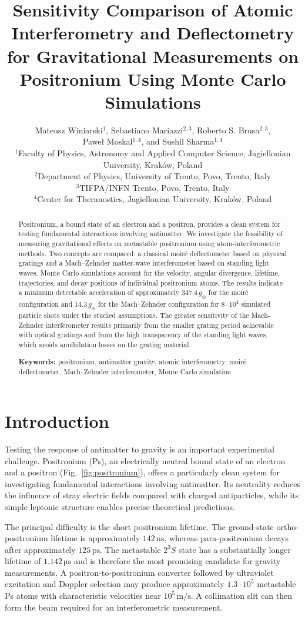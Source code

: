 \documentclass[10pt,twocolumn]{article}
\title{Sensitivity Comparison of Atomic Interferometry and Deflectometry for Gravitational Measurements on Positronium Using Monte Carlo Simulations}
\author{
Mateusz Winiarski$^{1}$, Sebastiano Mariazzi$^{2,3}$, Roberto S. Brusa$^{2,3}$,\\
Paweł Moskal$^{1,4}$, and Sushil Sharma$^{1,4}$\\[1ex]
\small $^{1}$Faculty of Physics, Astronomy and Applied Computer Science, Jagiellonian University, Kraków, Poland\\
\small $^{2}$Department of Physics, University of Trento, Povo, Trento, Italy\\
\small $^{3}$TIFPA/INFN Trento, Povo, Trento, Italy\\
\small $^{4}$Center for Theranostics, Jagiellonian University, Kraków, Poland
}
\date{}
\newcommand{\keywords}[1]{\par\medskip\noindent\textbf{Keywords:} #1}
\begin{document}
\maketitle

\begin{abstract}
Positronium, a bound state of an electron and a positron, provides a clean system for testing fundamental interactions involving antimatter. We investigate the feasibility of measuring gravitational effects on metastable positronium using atom-interferometric methods. Two concepts are compared: a classical moir\'e deflectometer based on physical gratings and a Mach--Zehnder matter-wave interferometer based on standing light waves. Monte Carlo simulations account for the velocity, angular divergence, lifetime, trajectories, and decay positions of individual positronium atoms. The results indicate a minimum detectable acceleration of approximately $347.4\,g_\oplus$ for the moir\'e configuration and $14.3\,g_\oplus$ for the Mach--Zehnder configuration for $8\cdot10^4$ simulated particle shots under the studied assumptions. The greater sensitivity of the Mach-Zehnder interferometer results primarily from the smaller grating period achievable with optical gratings and from the high transparency of the standing light waves, which avoids annihilation losses on the grating material.
\keywords{positronium, antimatter gravity, atomic interferometry, moir\'e deflectometer, Mach--Zehnder interferometer, Monte Carlo simulation}
\end{abstract}

\section{Introduction}

Testing the response of antimatter to gravity is an important experimental challenge. Positronium (Ps), an electrically neutral bound state of an electron and a positron (Fig.~\ref{fig:positronium}), offers a particularly clean system for investigating fundamental interactions involving antimatter\cite{Bass_Mariazzi_Moskal_Stepien_2023}. Its neutrality reduces the influence of stray electric fields compared with charged antiparticles, while its simple leptonic structure enables precise theoretical predictions.

The principal difficulty is the short positronium lifetime. The ground-state ortho-positronium lifetime is approximately $142\,\mathrm{ns}$, whereas para-positronium decays after approximately $125\,\mathrm{ps}$. The metastable $2^3S$ state has a substantially longer lifetime of $1.142\,\si{\micro\second}$ and is therefore the most promising candidate for gravity measurements\cite{Mariazzi_Caravita_Doser_Nebbia_Brusa_2020}. A positron-to-positronium converter followed by ultraviolet excitation and Doppler selection may produce approximately $1.3\cdot10^5$ metastable Ps atoms with characteristic velocities near $10^5\,\si{\meter\per\second}$. A collimation slit can then form the beam required for an interferometric measurement.
\end{document}
